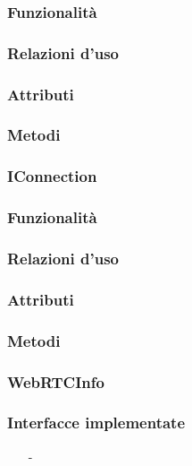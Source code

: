 \subsubsection*{Funzionalità}

\subsubsection*{Relazioni d'uso}

\subsubsection*{Attributi}

\subsubsection*{Metodi}

\subsubsection{IConnection}\label{sec:iconnection}

\subsubsection*{Funzionalità}

\subsubsection*{Relazioni d'uso}

\subsubsection*{Attributi}

\subsubsection*{Metodi}

\subsubsection{WebRTCInfo}\label{sec:webrtcinfo}

\subsubsection*{Interfacce implementate}
\begin{itemize}[noitemsep,nolistsep]
  \item[-]
\end{itemize}

